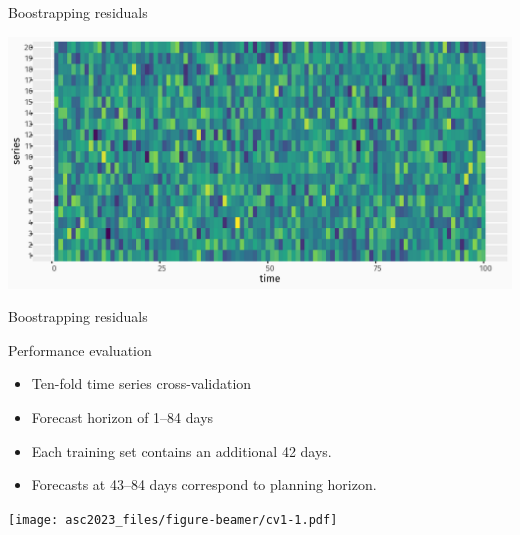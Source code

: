 \documentclass[
  14pt,
  ignorenonframetext,
  aspectratio=169,
]{beamer}
\providecommand{\tightlist}{%
  \setlength{\itemsep}{0pt}\setlength{\parskip}{0pt}}\usepackage{longtable,booktabs,array}
\begin{document}
\begin{frame}{Boostrapping residuals}
\label{boostrapping-residuals}
\vspace*{0.2cm}
\centerline{\includegraphics[width=15.5cm]{figs/sim_bootstrap.pdf}}
\end{frame}

\begin{frame}{Boostrapping residuals}
\label{boostrapping-residuals-1}
\vspace*{0.2cm}
\centerline{
}
\end{frame}

\begin{frame}{Performance evaluation}
\label{performance-evaluation}
\begin{itemize}
\tightlist
\item
  Ten-fold time series cross-validation
\item
  Forecast horizon of 1--84 days
\item
  Each training set contains an additional 42 days.
\item
  Forecasts at 43--84 days correspond to planning horizon.
\end{itemize}

\texttt{[image: asc2023\_files/figure-beamer/cv1-1.pdf]}
\end{frame}
\end{document}
